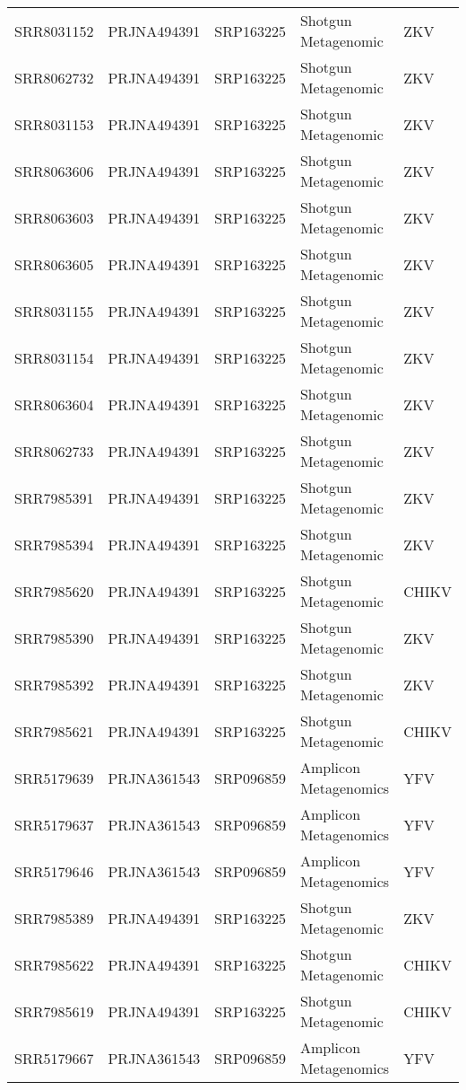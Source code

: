 \begin{scriptsize}
\begin{center}
\begin{longtable}{@{}lllll@{}}
SRR8031152 & PRJNA494391 & SRP163225 & Shotgun Metagenomic   & ZKV      \\
SRR8062732 & PRJNA494391 & SRP163225 & Shotgun Metagenomic   & ZKV      \\
SRR8031153 & PRJNA494391 & SRP163225 & Shotgun Metagenomic   & ZKV      \\
SRR8063606 & PRJNA494391 & SRP163225 & Shotgun Metagenomic   & ZKV      \\
SRR8063603 & PRJNA494391 & SRP163225 & Shotgun Metagenomic   & ZKV      \\
SRR8063605 & PRJNA494391 & SRP163225 & Shotgun Metagenomic   & ZKV      \\
SRR8031155 & PRJNA494391 & SRP163225 & Shotgun Metagenomic   & ZKV      \\
SRR8031154 & PRJNA494391 & SRP163225 & Shotgun Metagenomic   & ZKV      \\
SRR8063604 & PRJNA494391 & SRP163225 & Shotgun Metagenomic   & ZKV      \\
SRR8062733 & PRJNA494391 & SRP163225 & Shotgun Metagenomic   & ZKV      \\
SRR7985391 & PRJNA494391 & SRP163225 & Shotgun Metagenomic   & ZKV      \\
SRR7985394 & PRJNA494391 & SRP163225 & Shotgun Metagenomic   & ZKV      \\
SRR7985620 & PRJNA494391 & SRP163225 & Shotgun Metagenomic   & CHIKV    \\
SRR7985390 & PRJNA494391 & SRP163225 & Shotgun Metagenomic   & ZKV      \\
SRR7985392 & PRJNA494391 & SRP163225 & Shotgun Metagenomic   & ZKV      \\
SRR7985621 & PRJNA494391 & SRP163225 & Shotgun Metagenomic   & CHIKV    \\
SRR5179639 & PRJNA361543 & SRP096859 & Amplicon Metagenomics & YFV      \\
SRR5179637 & PRJNA361543 & SRP096859 & Amplicon Metagenomics & YFV      \\
SRR5179646 & PRJNA361543 & SRP096859 & Amplicon Metagenomics & YFV      \\
SRR7985389 & PRJNA494391 & SRP163225 & Shotgun Metagenomic   & ZKV      \\
SRR7985622 & PRJNA494391 & SRP163225 & Shotgun Metagenomic   & CHIKV    \\
SRR7985619 & PRJNA494391 & SRP163225 & Shotgun Metagenomic   & CHIKV    \\
SRR5179667 & PRJNA361543 & SRP096859 & Amplicon Metagenomics & YFV      \\

\end{longtable}
\end{center}
\end{scriptsize}
